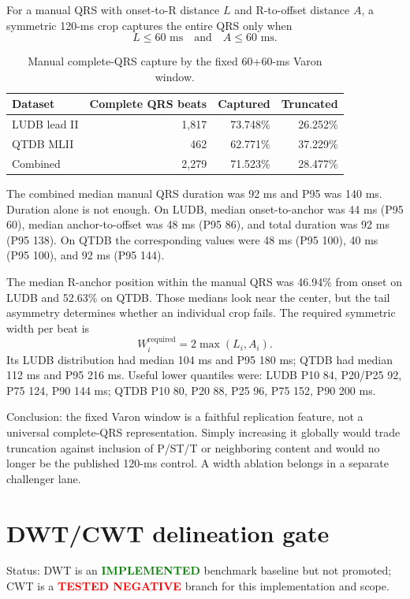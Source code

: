 \documentclass[11pt,a4paper]{article}
\newcommand{\implemented}{\textcolor{green}{\textbf{IMPLEMENTED}}}
\newcommand{\testednegative}{\textcolor{red}{\textbf{TESTED NEGATIVE}}}
\begin{document}
For a manual QRS with onset-to-R distance $L$ and R-to-offset distance $A$, a symmetric 120-ms crop captures the entire QRS only when
\[
L\leq 60\text{ ms}\quad\text{and}\quad A\leq 60\text{ ms}.
\]

\begin{table}[H]
\centering
\caption{Manual complete-QRS capture by the fixed 60+60-ms Varon window.}
\begin{tabular}{lrrr}
\toprule
Dataset & Complete QRS beats & Captured & Truncated \\
\midrule
LUDB lead II & 1,817 & 73.748\% & 26.252\% \\
QTDB MLII & 462 & 62.771\% & 37.229\% \\
Combined & 2,279 & 71.523\% & 28.477\% \\
\bottomrule
\end{tabular}
\end{table}

The combined median manual QRS duration was 92 ms and P95 was 140 ms. Duration alone is not enough. On LUDB, median onset-to-anchor was 44 ms (P95 60), median anchor-to-offset was 48 ms (P95 86), and total duration was 92 ms (P95 138). On QTDB the corresponding values were 48 ms (P95 100), 40 ms (P95 100), and 92 ms (P95 144).

The median R-anchor position within the manual QRS was 46.94\% from onset on LUDB and 52.63\% on QTDB. Those medians look near the center, but the tail asymmetry determines whether an individual crop fails. The required symmetric width per beat is
\[
W_i^{\mathrm{required}}=2\max(L_i,A_i).
\]
Its LUDB distribution had median 104 ms and P95 180 ms; QTDB had median 112 ms and P95 216 ms. Useful lower quantiles were: LUDB P10 84, P20/P25 92, P75 124, P90 144 ms; QTDB P10 80, P20 88, P25 96, P75 152, P90 200 ms.

Conclusion: the fixed Varon window is a faithful replication feature, not a universal complete-QRS representation. Simply increasing it globally would trade truncation against inclusion of P/ST/T or neighboring content and would no longer be the published 120-ms control. A width ablation belongs in a separate challenger lane.

\section{DWT/CWT delineation gate}
\label{sec:dwtcwt}

Status: DWT is an \implemented{} benchmark baseline but not promoted; CWT is a \testednegative{} branch for this implementation and scope.
\end{document}
